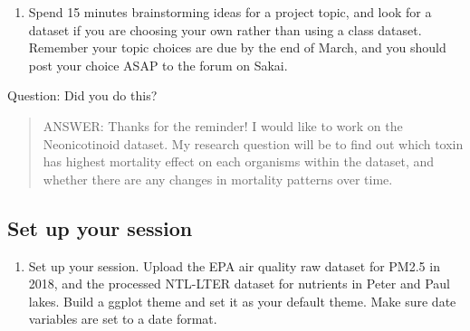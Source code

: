\documentclass[]{article}
\providecommand{\tightlist}{%
  \setlength{\itemsep}{0pt}\setlength{\parskip}{0pt}}
\begin{document}
\begin{enumerate}
\def\labelenumi{\arabic{enumi}.}
\tightlist
\item
  Spend 15 minutes brainstorming ideas for a project topic, and look for
  a dataset if you are choosing your own rather than using a class
  dataset. Remember your topic choices are due by the end of March, and
  you should post your choice ASAP to the forum on Sakai.
\end{enumerate}

Question: Did you do this?

\begin{quote}
ANSWER: Thanks for the reminder! I would like to work on the
Neonicotinoid dataset. My research question will be to find out which
toxin has highest mortality effect on each organisms within the dataset,
and whether there are any changes in mortality patterns over time.
\end{quote}

\subsection{Set up your session}\label{set-up-your-session}

\begin{enumerate}
\def\labelenumi{\arabic{enumi}.}
\setcounter{enumi}{1}
\tightlist
\item
  Set up your session. Upload the EPA air quality raw dataset for PM2.5
  in 2018, and the processed NTL-LTER dataset for nutrients in Peter and
  Paul lakes. Build a ggplot theme and set it as your default theme.
  Make sure date variables are set to a date format.
\end{enumerate}
\end{document}
